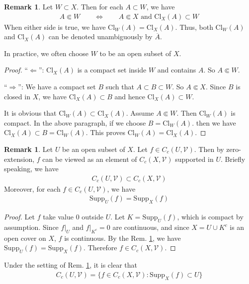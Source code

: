 \documentclass[12pt,b5paper,notitlepage]{article}
\theoremstyle{definition}
\newtheorem{rem}[df]{Remark}
\theoremstyle{plain}
\newcommand{\mc}{\mathcal}
\newcommand{\ovl}{\overline}
\newcommand{\Supp}{\mathrm{Supp}}
\newcommand{\Cl}{\mathrm{Cl}}
\numberwithin{equation}{section}
\begin{document}
\begin{rem}\label{lb1}
Let $W\subset X$. Then for each $A\subset W$, we have 
\begin{align*}
A\Subset W\qquad\Longleftrightarrow\qquad A\Subset X\text{ and }\Cl_X(A)\subset W
\end{align*}
When either side is true, we have $\Cl_W(A)=\Cl_X(A)$. Thus, both $\Cl_W(A)$ and $\Cl_X(A)$ can be denoted unambiguously by $\ovl A$.
\end{rem}

In practice, we often choose $W$ to be an open subset of $X$.

\begin{proof}
``$\Leftarrow$'': $\Cl_X(A)$ is a compact set inside $W$ and contains $A$. So $A\Subset W$.

``$\Rightarrow$'': We have a compact set $B$ such that $A\subset B\subset W$. So $A\Subset X$. Since $B$ is closed in $X$, we have $\Cl_X(A)\subset B$ and hence $\Cl_X(A)\subset W$.

It is obvious that $\Cl_W(A)\subset\Cl_X(A)$. Assume $A\Subset W$. Then $\Cl_W(A)$ is compact. In the above paragraph, if we choose $B=\Cl_W(A)$. then we have $\Cl_X(A)\subset B=\Cl_W(A)$. This proves $\Cl_W(A)=\Cl_X(A)$.
\end{proof}

\begin{rem}\label{lb2}
Let $U$ be an open subset of $X$. Let $f\in C_c(U,\mc V)$. Then by zero-extension, $f$ can be viewed as an element of $C_c(X,\mc V)$ supported in $U$. Briefly speaking, we have
\begin{align*}
C_c(U,\mc V)\subset C_c(X,\mc V)
\end{align*}
Moreover, for each $f\in C_c(U,\mc V)$, we have
\begin{align*}
\Supp_U(f)=\Supp_X(f)
\end{align*}
\end{rem}

\begin{proof}
Let $f$ take value $0$ outside $U$. Let $K=\Supp_U(f)$, which is compact by assumption. Since $f|_U$ and $f|_{K^c}=0$ are continuous, and since $X=U\cup K^c$ is an open cover on $X$, $f$ is continuous. By the Rem. \ref{lb1}, we have $\Supp_U(f)=\Supp_X(f)$. Therefore $f\in C_c(X,\mc V)$.
\end{proof}


Under the setting of Rem. \ref{lb2}, it is clear that
\begin{align}
C_c(U,\mc V)=\{f\in C_c(X,\mc V):\Supp_X(f)\subset U\}
\end{align}
\end{document}
